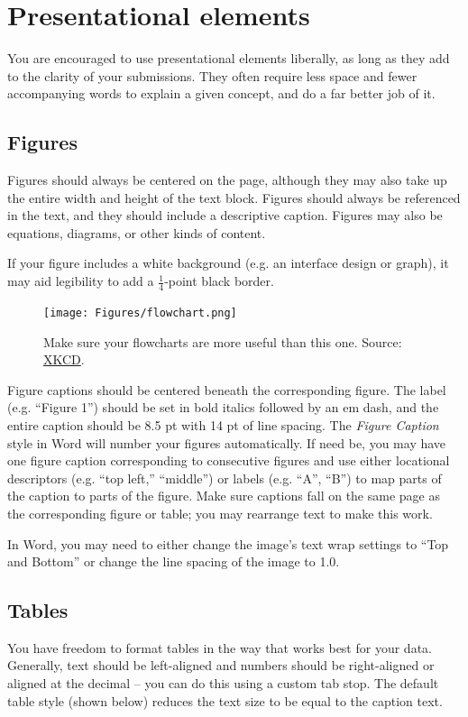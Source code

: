 \documentclass[
	letterpaper, %
]{jdf}
\begin{document}
\section{Presentational elements}
You are encouraged to use presentational elements liberally, as long as they add to the clarity of your submissions. They often require less space and fewer accompanying words to explain a given concept, and do a far better job of it.

\subsection{Figures}
Figures should always be centered on the page, although they may also take up the entire width and height of the text block. Figures should always be referenced in the text, and they should include a descriptive caption. Figures may also be equations, diagrams, or other kinds of content.

If your figure includes a white background (e.g. an interface design or graph), it may aid legibility to add a \(\frac{1}{4}\)-point black border.

\begin{figure}[h]
	\centering
	\texttt{[image: Figures/flowchart.png]}
	\caption{Make sure your flowcharts are more useful than this one. Source: \href{https://xkcd.com/1195/}{XKCD}.}
	\label{fig:flowchart}
\end{figure}

Figure captions should be centered beneath the corresponding figure. The label (e.g. “Figure 1”) should be set in bold italics followed by an em dash, and the entire caption should be 8.5 pt with 14 pt of line spacing. The \emph{Figure Caption} style in Word will number your figures automatically. If need be, you may have one figure caption corresponding to consecutive figures and use either locational descriptors (e.g. “top left,” “middle”) or labels (e.g. “A”, “B”) to map parts of the caption to parts of the figure. Make sure captions fall on the same page as the corresponding figure or table; you may rearrange text to make this work.

In Word, you may need to either change the image’s text wrap settings to “Top and Bottom” or change the line spacing of the image to 1.0.

\subsection{Tables}
You have freedom to format tables in the way that works best for your data. Generally, text should be left-aligned and numbers should be right-aligned or aligned at the decimal – you can do this using a custom tab stop. The default table style (shown below) reduces the text size to be equal to the caption text.
\end{document}

